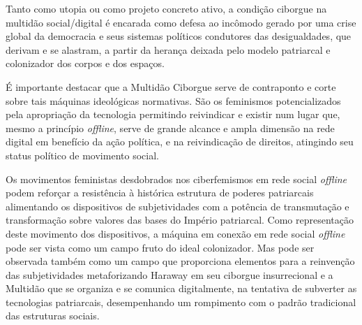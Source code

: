Tanto como utopia ou como projeto concreto ativo, a condição ciborgue na
multidão social/digital é encarada como defesa ao incômodo gerado por
uma crise global da democracia e seus sistemas políticos condutores das
desigualdades, que derivam e se alastram, a partir da herança deixada
pelo modelo patriarcal e colonizador dos corpos e dos espaços.

É importante destacar que a Multidão Ciborgue serve de contraponto e
corte sobre tais máquinas ideológicas normativas. São os feminismos
potencializados pela apropriação da tecnologia permitindo reivindicar e
existir num lugar que, mesmo a princípio \emph{offline}, serve de grande
alcance e ampla dimensão na rede digital em benefício da ação política,
e na reivindicação de direitos, atingindo seu status político de
movimento social.

Os movimentos feministas desdobrados nos ciberfemismos em rede social
\emph{offline} podem reforçar a resistência à histórica estrutura de poderes
patriarcais alimentando os dispositivos de subjetividades com a potência
de transmutação e transformação sobre valores das bases do Império
patriarcal. Como representação deste movimento dos dispositivos, a
máquina em conexão em rede social \emph{offline} pode ser vista como um campo
fruto do ideal colonizador. Mas pode ser observada também como um campo
que proporciona elementos para a reinvenção das subjetividades
metaforizando Haraway em seu ciborgue insurrecional e a Multidão que se
organiza e se comunica digitalmente, na tentativa de subverter as
tecnologias patriarcais, desempenhando um rompimento com o padrão
tradicional das estruturas sociais.

